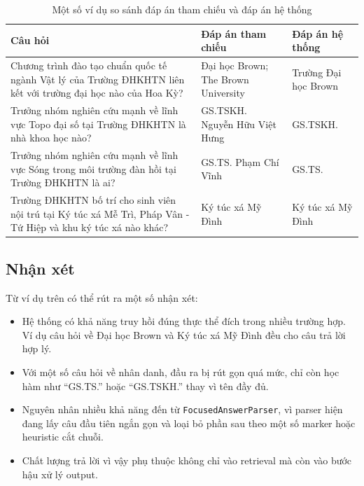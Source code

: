 \documentclass[12pt,a4paper]{article}
\begin{document}
\begin{table}[H]
\centering
\caption{Một số ví dụ so sánh đáp án tham chiếu và đáp án hệ thống}
\label{tab:qualitative}
\begin{tabularx}{\textwidth}{>{\raggedright\arraybackslash}p{} >{\raggedright\arraybackslash}X >{\raggedright\arraybackslash}X}
\toprule
\textbf{Câu hỏi} & \textbf{Đáp án tham chiếu} & \textbf{Đáp án hệ thống} \\
\midrule
Chương trình đào tạo chuẩn quốc tế ngành Vật lý của Trường ĐHKHTN liên kết với trường đại học nào của Hoa Kỳ? &
Đại học Brown; The Brown University &
Trường Đại học Brown \\
\midrule
Trưởng nhóm nghiên cứu mạnh về lĩnh vực Topo đại số tại Trường ĐHKHTN là nhà khoa học nào? &
GS.TSKH. Nguyễn Hữu Việt Hưng &
GS.TSKH. \\
\midrule
Trưởng nhóm nghiên cứu mạnh về lĩnh vực Sóng trong môi trường đàn hồi tại Trường ĐHKHTN là ai? &
GS.TS. Phạm Chí Vĩnh &
GS.TS. \\
\midrule
Trường ĐHKHTN bố trí cho sinh viên nội trú tại Ký túc xá Mễ Trì, Pháp Vân - Tứ Hiệp và khu ký túc xá nào khác? &
Ký túc xá Mỹ Đình &
Ký túc xá Mỹ Đình \\
\bottomrule
\end{tabularx}
\end{table}

\subsection{Nhận xét}

Từ ví dụ trên có thể rút ra một số nhận xét:
\begin{itemize}[leftmargin=1.5cm]
    \item Hệ thống có khả năng truy hồi đúng thực thể đích trong nhiều trường hợp. Ví dụ câu hỏi về Đại học Brown và Ký túc xá Mỹ Đình đều cho câu trả lời hợp lý.
    \item Với một số câu hỏi về nhân danh, đầu ra bị rút gọn quá mức, chỉ còn học hàm như ``GS.TS.'' hoặc ``GS.TSKH.'' thay vì tên đầy đủ.
    \item Nguyên nhân nhiều khả năng đến từ \texttt{FocusedAnswerParser}, vì parser hiện đang lấy câu đầu tiên ngắn gọn và loại bỏ phần sau theo một số marker hoặc heuristic cắt chuỗi.
    \item Chất lượng trả lời vì vậy phụ thuộc không chỉ vào retrieval mà còn vào bước hậu xử lý output.
\end{itemize}
\end{document}

